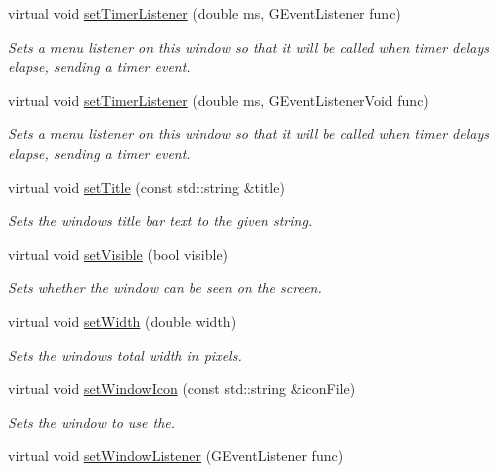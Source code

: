 \begin{DoxyCompactItemize}
virtual void \mbox{\hyperlink{classGWindow_ae0d5df4c2ed47156cbba7da55362e4e1}{set\+Timer\+Listener}} (double ms, G\+Event\+Listener func)
\begin{DoxyCompactList}\small\item\em Sets a menu listener on this window so that it will be called when timer delays elapse, sending a timer event. \end{DoxyCompactList}\item 
virtual void \mbox{\hyperlink{classGWindow_ae23e03c86580bbcefc2dee4d01d08091}{set\+Timer\+Listener}} (double ms, G\+Event\+Listener\+Void func)
\begin{DoxyCompactList}\small\item\em Sets a menu listener on this window so that it will be called when timer delays elapse, sending a timer event. \end{DoxyCompactList}\item 
virtual void \mbox{\hyperlink{classGWindow_abc79cf0667bbb5c93fca3f01b52c7b57}{set\+Title}} (const std\+::string \&title)
\begin{DoxyCompactList}\small\item\em Sets the window\textquotesingle{}s title bar text to the given string. \end{DoxyCompactList}\item 
virtual void \mbox{\hyperlink{classGWindow_a18e44e30b31525a243960ca3928125aa}{set\+Visible}} (bool visible)
\begin{DoxyCompactList}\small\item\em Sets whether the window can be seen on the screen. \end{DoxyCompactList}\item 
virtual void \mbox{\hyperlink{classGWindow_aa3f3fba4cb131baa8696ba01e3bceca1}{set\+Width}} (double width)
\begin{DoxyCompactList}\small\item\em Sets the window\textquotesingle{}s total width in pixels. \end{DoxyCompactList}\item 
virtual void \mbox{\hyperlink{classGWindow_ab21f6abd314b7ffd3ccf7b6e18ac18cb}{set\+Window\+Icon}} (const std\+::string \&icon\+File)
\begin{DoxyCompactList}\small\item\em Sets the window to use the. \end{DoxyCompactList}\item 
virtual void \mbox{\hyperlink{classGWindow_adbb687462d07ac5bd49f3861e4356838}{set\+Window\+Listener}} (G\+Event\+Listener func)

\end{DoxyCompactItemize}
